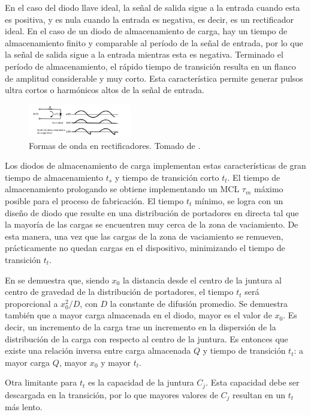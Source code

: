 En el caso del diodo llave ideal, la señal de salida sigue a la entrada cuando
esta es positiva, y es nula cuando la entrada es negativa, es decir, es un
rectificador ideal. En el caso de un diodo de almacenamiento de carga, hay un
tiempo de almacenamiento finito y comparable al período de la señal de entrada,
por lo que la señal de salida sigue a la entrada mientras esta es negativa.
Terminado el período de almacenamiento, el rápido tiempo de transición resulta
en un flanco de amplitud considerable y muy corto. Esta característica permite
generar pulsos ultra cortos o harmónicos altos de la señal de entrada.

\begin{figure}[t]
  \centering
    \includegraphics[width=0.4\textwidth]{images/charge_storage_diode_waveforms.jpg}
    \caption{Formas de onda en rectificadores. Tomado de \cite{moll1962}.}
    \label{fig:charge_storage_diode_waveforms}
\end{figure}

Los diodos de almacenamiento de carga implementan estas características de gran
tiempo de almacenamiento $t_s$ y tiempo de transición corto $t_t$. El tiempo de
almacenamiento prologando se obtiene implementando un MCL $\tau_m$ máximo
posible para el proceso de fabricación. El tiempo $t_t$ mínimo, se logra con un
diseño de diodo que resulte en una distribución de portadores en directa tal que
la mayoría de las cargas se encuentren muy cerca de la zona de vaciamiento. De
esta manera, una vez que las cargas de la zona de vaciamiento se remueven,
prácticamente no quedan cargas en el dispositivo, minimizando el tiempo de
transición $t_t$.

En \cite{moll1962} se demuestra que, siendo $x_0$ la distancia desde el centro
de la juntura al centro de gravedad de la distribución de portadores, el tiempo
$t_t$ será proporcional a $x_0^2/D$, con $D$ la constante de difusión promedio.
Se demuestra también que a mayor carga almacenada en el diodo, mayor es el valor
de $x_0$. Es decir, un incremento de la carga trae un incremento en la
dispersión de la distribución de la carga con respecto al centro de la juntura.
Es entonces que existe una relación inversa entre carga almacenada $Q$ y tiempo
de transición $t_t$: a mayor carga $Q$, mayor $x_0$ y mayor $t_t$.

Otra limitante para $t_t$ es la capacidad de la juntura $C_j$. Esta capacidad
debe ser descargada en la transición, por lo que mayores valores de $C_j$
resultan en un $t_t$ más lento.

